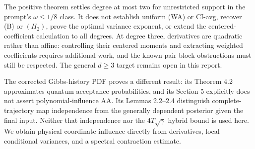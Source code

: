\documentclass[11pt]{article}
\begin{document}
The positive theorem settles degree at most two for unrestricted
support in the prompt's $\omega\le1/8$ class. It does not establish
uniform (WA) or CI-avg, recover (B) or $(H_2)$, prove the optimal
variance exponent, or extend the centered-coefficient calculation to
all degrees. At degree three, derivatives are quadratic rather than
affine: controlling their centered moments and extracting weighted
coefficients requires additional work, and the known pair-block
obstructions must still be respected. The general $d\ge3$ target
remains open in this report.

The corrected Gibbs-history PDF proves a different result: its
Theorem 4.2 approximates quantum acceptance probabilities, and its
Section 5 explicitly does not assert polynomial-influence AA.
Its Lemmas 2.2--2.4 distinguish complete-trajectory map independence
from the generally dependent posterior given the final input.
Neither that independence nor the $4T\sqrt\gamma$ hybrid bound
is used here. We obtain physical coordinate influence directly
from derivatives, local conditional variances, and a spectral
contraction estimate.

\appendix
\end{document}
